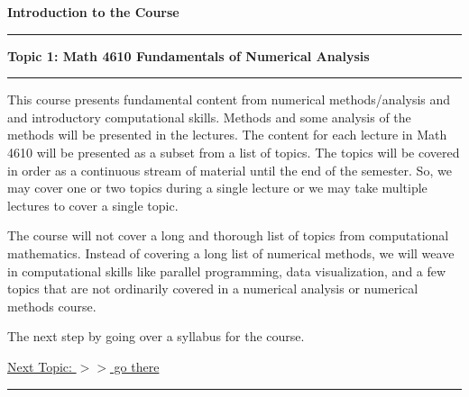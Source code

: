 \documentclass[10pt,fleqn]{article}
\begin{document}
\noindent
{\bf{\Large Introduction to the Course }}
\vskip0.1in\hrule\vskip0.1in
\noindent
{\bf Topic 1: Math 4610 Fundamentals of Numerical Analysis} 
\vskip0.1in\hrule\vskip0.1in
\noindent
This course presents fundamental content from numerical methods/analysis and
and introductory computational skills. Methods and some analysis of the methods
will be presented in the lectures. The content for each lecture in Math 4610
will be presented as a subset from a list of topics. The topics will be covered
in order as a continuous stream of material until the end of the semester. So,
we may cover one or two topics during a single lecture or we may take multiple
lectures to cover a single topic.

The course will not cover a long and thorough list of topics from computational
mathematics. Instead of covering a long list of numerical methods, we will weave
in computational skills like parallel programming, data visualization, and a few
topics that are not ordinarily covered in a numerical analysis or numerical
methods course.

The next step by going over a syllabus for the course.

\href{../../topic_02/pdf/topic_02.pdf}{Next Topic: $>>$ go there}

\vskip0.1in\hrule\vskip0.1in
\end{document}

